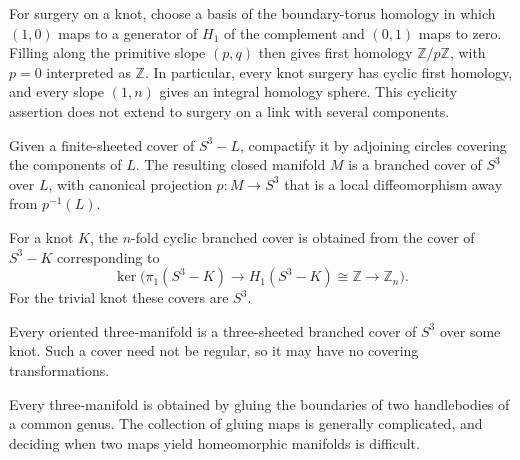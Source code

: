 \begin{remark}
\label{thurston-ch01-surgery-homology}

For surgery on a knot, choose a basis of the boundary-torus homology in which $(1,0)$ maps to a generator of $H_1$ of the complement and $(0,1)$ maps to zero.  Filling along the primitive slope $(p,q)$ then gives first homology $\mathbb Z/p\mathbb Z$, with $p=0$ interpreted as $\mathbb Z$.  In particular, every knot surgery has cyclic first homology, and every slope $(1,n)$ gives an integral homology sphere.  This cyclicity assertion does not extend to surgery on a link with several components.
\end{remark}

\begin{definition}
\label{thurston-ch01-branched-cover}

Given a finite-sheeted cover of $S^3-L$, compactify it by adjoining circles covering the components of $L$.  The resulting closed manifold $M$ is a branched cover of $S^3$ over $L$, with canonical projection $p:M\to S^3$ that is a local diffeomorphism away from $p^{-1}(L)$.
\end{definition}

\begin{definition}
\label{thurston-ch01-cyclic-branched-cover}

For a knot $K$, the $n$-fold cyclic branched cover is obtained from the cover of $S^3-K$ corresponding to
\[
\ker\bigl(\pi_1(S^3-K)\longrightarrow H_1(S^3-K)\cong\mathbb Z\longrightarrow\mathbb Z_n\bigr).
\]
For the trivial knot these covers are $S^3$.
\end{definition}

\begin{theorem}
\label{thurston-ch01-three-sheeted-cover}

Every oriented three-manifold is a three-sheeted branched cover of $S^3$ over some knot.  Such a cover need not be regular, so it may have no covering transformations.
\end{theorem}

\begin{theorem}
\label{thurston-ch01-heegaard-decomposition}

Every three-manifold is obtained by gluing the boundaries of two handlebodies of a common genus.  The collection of gluing maps is generally complicated, and deciding when two maps yield homeomorphic manifolds is difficult.
\end{theorem}

